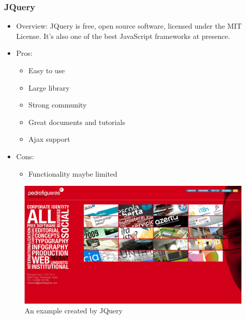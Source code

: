 \documentclass[14pt,a4paper]{extreport}
\begin{document}
		\subsubsection{JQuery}
			\begin{itemize}
				\item Overview: JQuery is free, open source software, licensed under the MIT License. It's also one of the best JavaScript frameworks at presence.
				\item Pros: 
					\begin{itemize}
						\item Easy to use
						\item Large library
						\item Strong community
						\item Great documents and tutorials
						\item Ajax support
					\end{itemize}
				\item Cons:
					\begin{itemize}
						\item Functionality maybe limited
					
					\end{itemize}
			\end{itemize}
			\begin{figure}
				\begin{center}
				\includegraphics[scale=1.2]{jquery.png}
				\caption{An example created by JQuery}
				\end{center}
			
			\end{figure}
\end{document}
